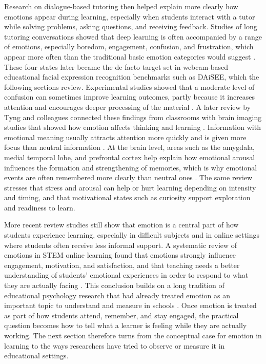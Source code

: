 Research on dialogue-based tutoring then helped explain more clearly how emotions appear during learning, especially when students interact with a tutor while solving problems, asking questions, and receiving feedback. Studies of long tutoring conversations showed that deep learning is often accompanied by a range of emotions, especially boredom, engagement, confusion, and frustration, which appear more often than the traditional basic emotion categories would suggest \cite{dmello_language_2012}. These four states later became the de facto target set in webcam-based educational facial expression recognition benchmarks such as \ac{DAiSEE}, which the following sections review. Experimental studies showed that a moderate level of confusion can sometimes improve learning outcomes, partly because it increases attention and encourages deeper processing of the material \cite{dmello2014confusionbeneficial}. A later review by Tyng and colleagues connected these findings from classrooms with brain imaging studies that showed how emotion affects thinking and learning \cite{tyng_influences_2017}. Information with emotional meaning usually attracts attention more quickly and is given more focus than neutral information \cite{schupp2007selective,vuilleumier2005brainsbeware}. At the brain level, areas such as the amygdala, medial temporal lobe, and prefrontal cortex help explain how emotional arousal influences the formation and strengthening of memories, which is why emotional events are often remembered more clearly than neutral ones \cite{tyng_influences_2017,sharot2004emotionremembering}. The same review stresses that stress and arousal can help or hurt learning depending on intensity and timing, and that motivational states such as curiosity support exploration and readiness to learn.

More recent review studies still show that emotion is a central part of how students experience learning, especially in difficult subjects and in online settings where students often receive less informal support. A systematic review of emotions in STEM online learning found that emotions strongly influence engagement, motivation, and satisfaction, and that teaching needs a better understanding of students' emotional experiences in order to respond to what they are actually facing \cite{anwar_emotions_2023}. This conclusion builds on a long tradition of educational psychology research that had already treated emotion as an important topic to understand and measure in schools \cite{schutz2007emotioneducation}. Once emotion is treated as part of how students attend, remember, and stay engaged, the practical question becomes how to tell what a learner is feeling while they are actually working. The next section therefore turns from the conceptual case for emotion in learning to the ways researchers have tried to observe or measure it in educational settings.


